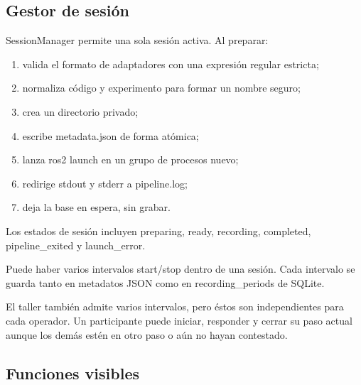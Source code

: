 \documentclass[11pt,a4paper]{article}
\begin{document}
\subsection{Gestor de sesión}

{\ttfamily\small SessionManager} permite una sola sesión activa. Al preparar:

\begin{enumerate}
\item valida el formato de adaptadores con una expresión regular estricta;
\item normaliza código y experimento para formar un nombre seguro;
\item crea un directorio privado;
\item escribe {\ttfamily\small metadata.json} de forma atómica;
\item lanza {\ttfamily\small ros2 launch} en un grupo de procesos nuevo;
\item redirige stdout y stderr a {\ttfamily\small pipeline.log};
\item deja la base en espera, sin grabar.
\end{enumerate}

Los estados de sesión incluyen {\ttfamily\small preparing}, {\ttfamily\small ready}, {\ttfamily\small recording}, {\ttfamily\small completed}, {\ttfamily\small pipeline\_exited} y {\ttfamily\small launch\_error}.

Puede haber varios intervalos start/stop dentro de una sesión. Cada intervalo se guarda tanto en metadatos JSON como en {\ttfamily\small recording\_periods} de SQLite.

El taller también admite varios intervalos, pero éstos son independientes para cada
operador. Un participante puede iniciar, responder y cerrar su paso actual aunque los demás
estén en otro paso o aún no hayan contestado.

\subsection{Funciones visibles}
\end{document}
